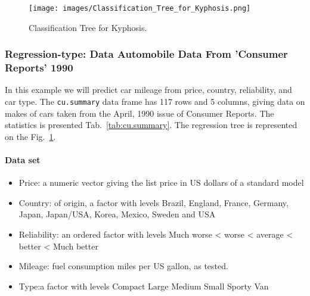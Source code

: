 \documentclass[final, paper=letter,5p,times,twocolumn]{elsarticle}
\begin{document}
\begin{figure}[htbp]
   \begin{center}
      \texttt{[image: images/Classification\_Tree\_for\_Kyphosis.png]}
   \end{center}
   \caption{Classification Tree for Kyphosis.}
  \label{fig:Tree_for_Kyphosis} 
\end{figure}

\subsubsection{Regression-type: Data Automobile Data From 'Consumer Reports' 1990}

In this example we will predict car mileage from price, country, reliability, and car type. The \texttt{cu.summary} data frame has 117 rows and 5 columns, giving data on makes of cars taken from the April, 1990 issue of Consumer Reports. The statistics is presented Tab.~\ref{tab:cu.summary}. The regression tree is represented on the Fig.~\ref{fig:Tree_for_Kyphosis}.

\paragraph{Data set}{
  \begin{itemize}
  \item Price: a numeric vector giving the list price in US dollars of a standard model
  \item Country: of origin, a factor with levels Brazil, England, France, Germany, Japan, Japan/USA, Korea, Mexico, Sweden and USA
  \item Reliability: an ordered factor with levels Much worse < worse < average < better < Much better
  \item Mileage: fuel consumption miles per US gallon, as tested.
  \item Type:a factor with levels Compact Large Medium Small Sporty Van
  \end{itemize}
}
\end{document}
